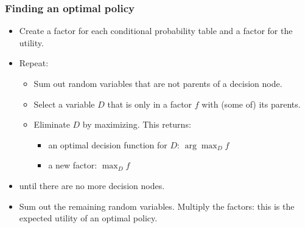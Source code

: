 \documentclass[12pt]{beamer} %
\newcommand{\figdir}{../../figures/ch06}
\begin{document}
\begin{frame}
\frametitle{Finding an optimal policy}

\begin{itemize}
\item Create a factor for each conditional probability table and a
factor for the utility.\pause
\item Repeat:
\begin{itemize}
\item Sum out random variables that are not parents of a decision node.
\item Select a variable $D$ that is only in a factor $f$ with (some of)
its parents.
\item Eliminate $D$ by maximizing. This returns:
\begin{itemize}
\item an optimal decision function for $D$: $\arg\max_D f$
\item a new factor: $\max_D f$
\end{itemize}
\end{itemize}
\item until there are no more decision nodes.
\item Sum out the remaining random variables. Multiply the factors:
this is the expected utility of an optimal policy.
\end{itemize}
\end{frame}
\end{document}
